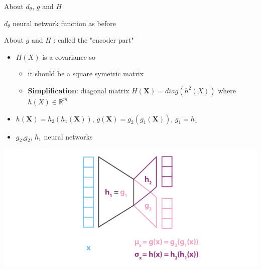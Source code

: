 \documentclass[compress,10pt]{beamer}
\begin{document}
\begin{frame}[fragile]{About $d_\theta$, $g$ and $H$}
  
$d_\theta$ neural network function as before   

About $g$ and $H$ : called the "encoder part"
 
\begin{itemize}
\item    $H(X)$ is a covariance so
\begin{itemize}
\item  it should be a square symetric matrix
\item  \textbf{Simplification}: diagonal matrix $H(\mathbf{X}) = diag(h^2(X))$ where  $h(X) \in \mathbb{R}^m$
\end{itemize}
\item
  \(h(\mathbf{X}) = h_2(h_1(\mathbf{X}))\), \(g(\mathbf{X}) = g_2(g_1(\mathbf{X}))\), \(g_1 = h_1\)
  \item $g_2$,$g_2$, $h_1$ neural networks 
\end{itemize}

\begin{center}\includegraphics[width=0.7\linewidth]{images/approxZ} \end{center}

\end{frame}
\end{document}
